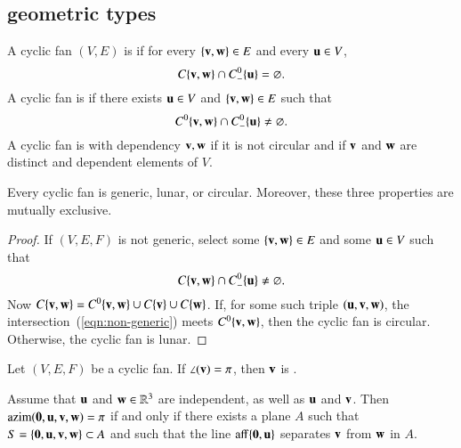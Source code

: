 \subsection{geometric types}\label{sec:types}

\begin{definition}
A cyclic fan $(V,E)$ is  if for every $\{{\mathbf v},{\mathbf w}\}\in E$
and every ${\mathbf u}\in V$, 
$$
C\{{\mathbf v},{\mathbf w}\}\cap C^0_-\{{\mathbf u}\} = \varnothing.
$$
A cyclic fan is  if there exists ${\mathbf u}\in V$ and $\{{\mathbf v},{\mathbf w}\}\in E$ such that 
$$
C^0\{{\mathbf v},{\mathbf w}\}\cap C^0_-\{{\mathbf u}\}\ne \varnothing.
$$
A cyclic fan is  with dependency ${\mathbf v},{\mathbf w}$ if it is not circular and if ${\mathbf v}$ and ${\mathbf w}$ are distinct and dependent elements of $V$.
\end{definition}
%
%
%


\begin{lemma} Every cyclic fan is
generic, lunar, or circular.  Moreover, these three properties are mutually exclusive.
\end{lemma}
%
%
%
%
%

\begin{proof} If $(V,E,F)$ is not generic,  select some $\{{\mathbf v},{\mathbf w}\}\in E$
and some ${\mathbf u}\in V$ such that
\begin{equation}\label{eqn:non-generic}
C\{{\mathbf v},{\mathbf w}\}\cap C^0_-\{{\mathbf u}\} \ne \varnothing.
\end{equation}
Now $C\{{\mathbf v},{\mathbf w}\} = C^0\{{\mathbf v},{\mathbf w}\} \cup C\{{\mathbf v}\}\cup C\{{\mathbf w}\}$.  
If, for some such triple $({\mathbf u},{\mathbf v},{\mathbf w})$, the intersection~(\ref{eqn:non-generic}) meets $C^0\{{\mathbf v},{\mathbf w}\}$, then the cyclic fan is circular.  
Otherwise, the cyclic fan is lunar. 
\end{proof}

\begin{definition}[flat] Let $(V,E,F)$ be a cyclic fan.
If $\angle({\mathbf v})=\pi$, then ${\mathbf v}$ is .
\end{definition}


\begin{lemma}  \label{lemma:coplanar}
Assume that ${\mathbf u}$ and ${\mathbf w}\in\mathbb{R}^3$ are independent, as well as ${\mathbf u}$ and ${\mathbf v}$.  Then ${\operatorname{azim}}({\mathbf 0},{\mathbf u},{\mathbf v},{\mathbf w})=\pi$
if and only if there exists a plane $A$ such that
$S=\{{\mathbf 0},{\mathbf u},{\mathbf v},{\mathbf w}\}\subset A$ and such that the line ${\operatorname{aff}}\{{\mathbf 0},{\mathbf u}\}$ separates ${\mathbf v}$ from ${\mathbf w}$ in $A$.
\end{lemma}

